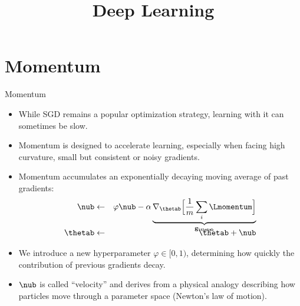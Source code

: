 




\newcommand{\titlefigure}{figure/momentum.png}
\newcommand{\learninggoals}{
  \item 
  \item 
  \item 
}

\title{Deep Learning}
\date{}




\section{Momentum}
\begin{vbframe}{Momentum}
  \begin{itemize}
    \item While SGD remains a popular optimization strategy, learning with it can sometimes be slow. 
    \item Momentum is designed to accelerate learning, especially when facing high curvature, small but consistent or noisy gradients.
    \item Momentum accumulates an exponentially decaying moving average of past gradients:
      \begin{eqnarray*} 
        \nub &\leftarrow& \varphi \nub - \alpha \underbrace{\nabla_{\thetab} \Big[\frac{1}{m} \sum_{i} \Lmomentum \Big]}_{\mathbf{g}_{\thetab}}\\[-0.3cm]
        \thetab &\leftarrow& \thetab + \nub
      \end{eqnarray*}
    \item We introduce a new hyperparameter $\varphi \in [0, 1)$, determining how quickly the contribution of previous gradients decay.
    \item $\nub$ is called \enquote{velocity} and derives from a physical analogy describing how particles move through a parameter space (Newton's law of motion).
  \end{itemize}
\end{vbframe}

